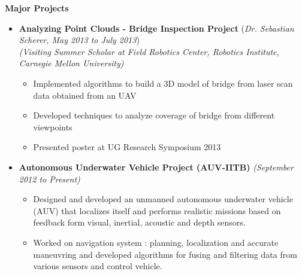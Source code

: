 \documentclass[a4paper,10pt]{article}
\newcommand{\isep}{-2 pt}
\newcommand{\resheading}[1]{{\small \colorbox{mygrey}{\begin{minipage}{0.975\textwidth}{\textbf{#1 \vphantom{p\^{E}}}}\end{minipage}}}}
\begin{document}
\resheading{\textbf{\large{Major Projects}}}
\begin{itemize}
    \item \textbf{Analyzing Point Clouds - Bridge Inspection Project} \hfill (\emph{Dr. Sebastian Scherer, May 2013 to July 2013}) \\
        \emph{(Visiting Summer Scholar at Field Robotics Center, Robotics Institute, Carnegie Mellon University)} \\[-0.6cm]
        \begin{itemize} \itemsep \isep
            \item Implemented algorithms to build a 3D model of bridge from laser scan data obtained from an UAV
            \item Developed techniques to analyze coverage of bridge from different viewpoints
            \item Presented poster at UG Research Symposium 2013
        \end{itemize}

    \item \textbf{Autonomous Underwater Vehicle Project (AUV-IITB)} \hfill \emph{(September 2012 to Present) } \\[-0.6cm]
    \begin{itemize} \itemsep \isep
        \item Designed and developed an unmanned autonomous underwater vehicle (AUV) that localizes itself and performs realistic missions based on feedback form visual, inertial, acoustic and depth sensors. 
        \item Worked on navigation system : planning, localization and accurate maneuvring and developed algorithms for fusing and filtering data from various sensors and control vehicle. \\[-0.6cm]
    \end{itemize}
    \begin{comment}
    \item \textbf{ High Level Synthesis using Legup} \hfill \emph{(Guided by Prof. S. Patkar, September 2012 to Present) }  \\[-0.6cm]
    \begin{itemize} \itemsep \isep 
        \item Working under High Power Computing Lab, EE Dept. on HLS to implement a memory model using stacks or queues to improve the synthesis of specific applications with regular and iterative 
        \item Building up on legup infrastructure to analyze different high level synthesis techniques
        \end{itemize}
    \end{comment}



\end{itemize}
\end{document}
